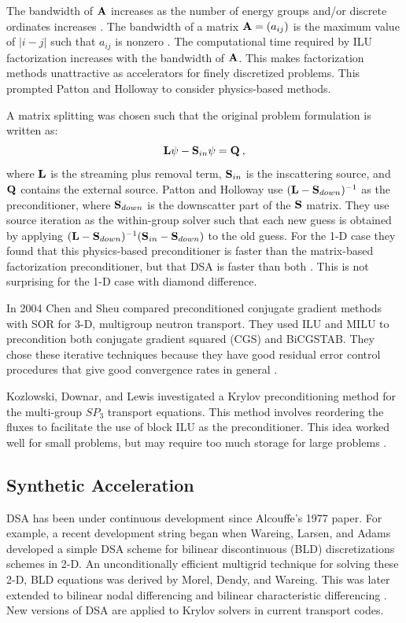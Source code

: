 The bandwidth of $\mathbf{A}$ increases as the number of energy groups and/or discrete ordinates increases \cite{Patton2002}. The bandwidth of a matrix $\mathbf{A}=(a_{ij})$ is the maximum value of $|i-j|$ such that $a_{ij}$ is nonzero \cite{Wolfram2011}. The computational time required by ILU factorization increases with the bandwidth of $\mathbf{A}$. This makes factorization methods unattractive as accelerators for finely discretized problems. This prompted Patton and Holloway to consider physics-based methods. 

A matrix splitting was chosen such that the original problem formulation is written as:
%
\begin{equation}
  \mathbf{L}\psi - \mathbf{S}_{in}\psi = \mathbf{Q} \:,
\end{equation}
%
where $\mathbf{L}$ is the streaming plus removal term, $\mathbf{S}_{in}$ is the inscattering source, and $\mathbf{Q}$ contains the external source. Patton and Holloway use $(\mathbf{L} - \mathbf{S}_{down})^{-1}$ as the preconditioner, where  $\mathbf{S}_{down}$ is the downscatter part of the $\mathbf{S}$ matrix. They use source iteration as the within-group solver such that each new guess is obtained by applying $(\mathbf{L} - \mathbf{S}_{down})^{-1}(\mathbf{S}_{in} - \mathbf{S}_{down})$ to the old guess. For the 1-D case they found that this physics-based preconditioner is faster than the matrix-based factorization preconditioner, but that DSA is faster than both \cite{Patton2002}. This is not surprising for the 1-D case with diamond difference. 

In 2004 Chen and Sheu compared preconditioned conjugate gradient methods with SOR for 3-D, multigroup neutron transport. They used ILU and MILU to precondition both conjugate gradient squared (CGS) and BiCGSTAB. They chose these iterative techniques because they have good residual error control procedures that give good convergence rates in general \cite{Chen2004}.

Kozlowski, Downar, and Lewis investigated a Krylov preconditioning method for the multi-group $SP_3$ transport equations. This method involves reordering the fluxes to facilitate the use of block ILU as the preconditioner. This idea worked well for small problems, but may require too much storage for large problems \cite{Kozlowski2003}.

\subsection{Synthetic Acceleration}
DSA has been under continuous development since Alcouffe's 1977 paper. For example, a recent development string began when Wareing, Larsen, and Adams developed a simple DSA scheme for bilinear discontinuous (BLD) discretizations schemes in 2-D. An unconditionally efficient multigrid technique for solving these 2-D, BLD equations was derived by Morel, Dendy, and Wareing. This was later extended to bilinear nodal differencing and bilinear characteristic differencing \cite{Adams2002}. New versions of DSA are applied to Krylov solvers in current transport codes.

